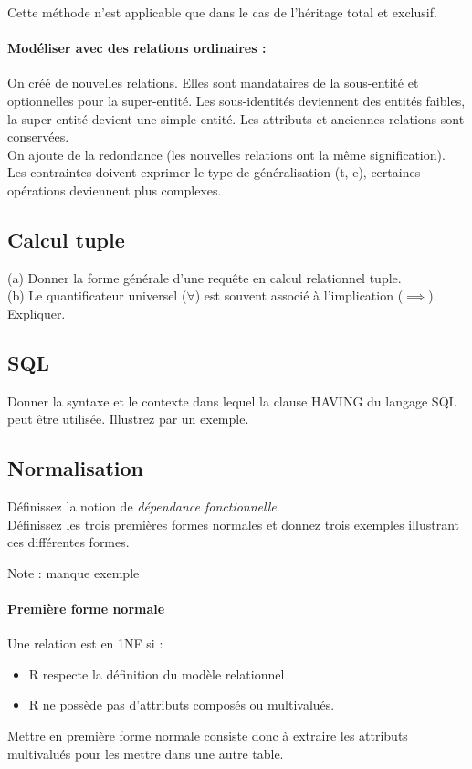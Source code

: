 Cette méthode n'est applicable que dans le cas de l'héritage total et exclusif.

\paragraph{Modéliser avec des relations ordinaires :}
On créé de nouvelles relations. Elles sont mandataires de la sous-entité et 
optionnelles pour la super-entité.
Les sous-identités deviennent des entités faibles, la super-entité devient 
une simple entité.
Les attributs et anciennes relations sont conservées.\\

On ajoute de la redondance (les nouvelles relations ont la m\^eme signification).
Les contraintes doivent exprimer le type de généralisation (t, e), 
certaines opérations deviennent plus complexes.

\subsection{Calcul tuple}

(a) Donner la forme générale d'une requête en calcul relationnel tuple.\\
(b) Le quantificateur universel ($\forall$) est souvent associé à l'implication 
($\implies$). Expliquer.

\subsection{SQL}
Donner la syntaxe et le contexte dans lequel la clause HAVING du langage SQL peut être 
utilisée. Illustrez par un exemple.



\subsection{Normalisation}
Définissez la notion de \textit{dépendance fonctionnelle}. \\
Définissez les trois premières formes normales et donnez trois exemples 
illustrant ces différentes formes.

Note : manque exemple

\paragraph{Première forme normale}
Une relation est en 1NF si : 
\begin{itemize}
	\item R respecte la définition du modèle relationnel
	\item R ne possède pas d'attributs composés ou multivalués.
\end{itemize}
Mettre en première forme normale consiste donc à extraire les attributs multivalués pour les mettre dans une autre table.

